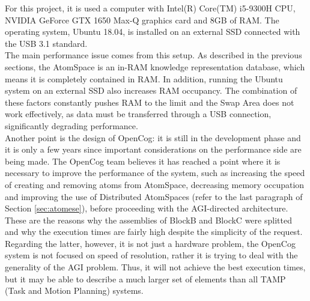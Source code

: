 For this project, it is used a computer with Intel(R) Core(TM) i5-9300H CPU, NVIDIA GeForce GTX 1650 Max-Q graphics card and 8GB of RAM. 
The operating system, Ubuntu 18.04, is installed on an external SSD connected with the USB 3.1 standard. \\
The main performance issue comes from this setup. As described in the previous sections, the AtomSpace is an in-RAM knowledge representation database, which means it is completely contained in RAM. In addition, running the Ubuntu system on an external SSD also increases RAM occupancy. 
The combination of these factors constantly pushes RAM to the limit and the Swap Area does not work effectively, as data must be transferred through a USB connection, significantly degrading performance. \\
Another point is the design of OpenCog: it is still in the development phase and it is only a few years since important considerations on the performance side are being made. 
The OpenCog team believes it has reached a point where it is necessary to improve the performance of the system, such as increasing the speed of creating and removing atoms from AtomSpace, decreasing memory occupation and improving the use of Distributed AtomSpaces (refer to the last paragraph of Section \ref{sec:atomese}), before proceeding with the AGI-directed architecture. \\
These are the reasons why the assemblies of BlockB and BlockC were splitted and why the execution times are fairly high despite the simplicity of the request.
Regarding the latter, however, it is not just a hardware problem, the OpenCog system is not focused on speed of resolution, rather it is trying to deal with the generality of the AGI problem. Thus, it will not achieve the best execution times, but it may be able to describe a much larger set of elements than all TAMP (Task and Motion Planning) systems.